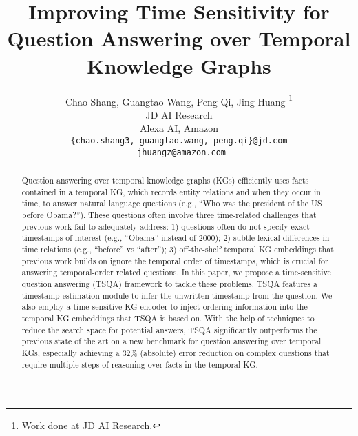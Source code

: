 \documentclass[11pt]{article}
\title{Improving Time Sensitivity for Question Answering over Temporal Knowledge Graphs}
\author{
Chao Shang\wg, Guangtao Wang\wg, Peng Qi\wg, 
Jing Huang\ws
\thanks{ \hspace{1mm} Work done at JD AI Research.} \\
  \wg JD AI Research\\
  \ws Alexa AI, Amazon\\
  \texttt{\{chao.shang3, guangtao.wang, peng.qi\}@jd.com} \\ \texttt{ jhuangz@amazon.com}\\}
\begin{document}
\maketitle
\begin{abstract}

Question answering over temporal knowledge graphs (KGs) efficiently uses facts contained in a temporal KG, which records entity relations and when they occur in time, to answer natural language questions (e.g., ``Who was the president of the US before Obama?''). These questions often involve three time-related challenges that previous work fail to adequately address: 1) questions often do not specify exact timestamps of interest (e.g., ``Obama'' instead of 2000); 2) subtle lexical differences in time relations (e.g., ``before'' vs ``after''); 3) off-the-shelf temporal KG embeddings that previous work builds on ignore the temporal order of timestamps, which is crucial for answering temporal-order related questions. In this paper, we propose a time-sensitive question answering (TSQA) framework to tackle these problems. TSQA features a timestamp estimation module to infer the unwritten timestamp from the question. We also employ a time-sensitive KG encoder to inject ordering information into the temporal KG embeddings that TSQA is based on. With the help of techniques to reduce the search space for potential answers, TSQA significantly outperforms the previous state of the art on a new benchmark for question answering over temporal KGs, especially achieving a 32\% (absolute) error reduction on complex questions that require multiple steps of reasoning over facts in the temporal KG.




\end{abstract}
\end{document}
